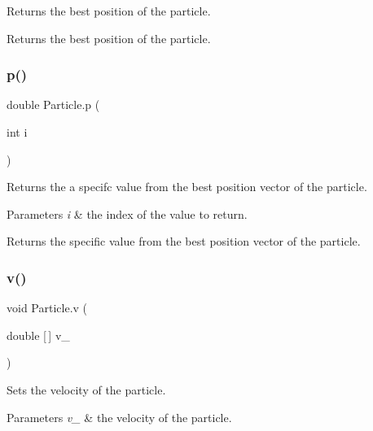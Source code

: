 Returns the best position of the particle. \begin{DoxyReturn}{Returns}
the best position of the particle. 
\end{DoxyReturn}
\mbox{\label{class_particle_a3ffe07f8456b8f145631fe6e9ae01909}} 
\subsubsection{\texorpdfstring{p()}{p()}\hspace{0.1cm}{\footnotesize\ttfamily [3/3]}}
{\footnotesize\ttfamily double Particle.\+p (\begin{DoxyParamCaption}\item[{int}]{i }\end{DoxyParamCaption})}

Returns the a specifc value from the best position vector of the particle. 
\begin{DoxyParams}{Parameters}
{\em i} & the index of the value to return. \\
\hline
\end{DoxyParams}
\begin{DoxyReturn}{Returns}
the specific value from the best position vector of the particle. 
\end{DoxyReturn}
\mbox{\label{class_particle_ae2f3c637da6701fb0e48c574493f7ec1}} 
\subsubsection{\texorpdfstring{v()}{v()}\hspace{0.1cm}{\footnotesize\ttfamily [1/3]}}
{\footnotesize\ttfamily void Particle.\+v (\begin{DoxyParamCaption}\item[{double \mbox{[}$\,$\mbox{]}}]{v\+\_\+ }\end{DoxyParamCaption})}

Sets the velocity of the particle. 
\begin{DoxyParams}{Parameters}
{\em v\+\_\+} & the velocity of the particle. \\
\hline
\end{DoxyParams}
\mbox{\label{class_particle_a82665a73d72400706763a8fe62a4b677}} 
